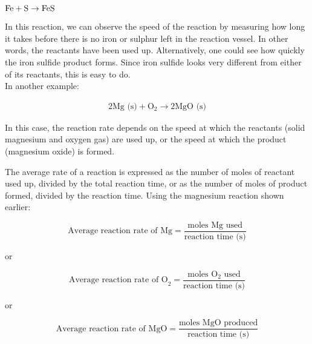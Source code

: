 \begin{center}
$\rm{Fe + S \rightarrow FeS}$
\end{center}

In this reaction, we can observe the speed of the reaction by measuring how long it takes before there is no iron or sulphur left in the reaction vessel. In other words, the reactants have been used up. Alternatively, one could see how quickly the iron sulfide product forms. Since iron sulfide looks very different from either of its reactants, this is easy to do. \\

In another example:

\begin{eqnarray*}
2\text{Mg (s)} + \text{O}_{2} \rightarrow 2\text{MgO (s)}
\end{eqnarray*}

In this case, the reaction rate depends on the speed at which the reactants (solid
magnesium and oxygen gas) are used up, or the speed at which the product (magnesium oxide) is formed.


The average rate of a reaction is expressed as the number of
moles of reactant used up, divided by the total reaction time, or as the number of moles of product formed, divided by the reaction time. Using the magnesium reaction shown earlier:

\begin{equation*}
\text{Average reaction rate of Mg} = \frac{\text{moles Mg used}}{\text{reaction time (s)}}
\end{equation*}

\begin{center}
or
\end{center}

\begin{equation*}
\text{Average reaction rate of O}_{2} = \frac{\text{moles O}_{2} \text{ used}}{\text{reaction time (s)}}
\end{equation*}

\begin{center}
or
\end{center}

\begin{equation*}
\text{Average reaction rate of MgO} = \frac{\text{moles MgO produced}}{\text{reaction time (s)}}
\end{equation*}

